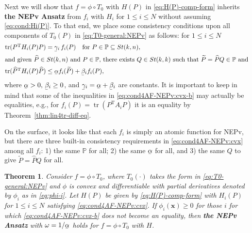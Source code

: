 \documentclass[11pt]{article}
\def\bx{\pmb{x}}
\def\bbP{\mathbb{P}}
\def\scrH{\mathscr{H}}
\def\wtd{\widetilde}
\def\what{\widehat}
\newcommand\munderbar[1]{%
  \underaccent{\bar}{#1}}
\newcommand\STM[2]{{\rm St}(#1,#2)}
\DeclareMathOperator{\tr}{tr}
\DeclareMathOperator{\T}{T}
\newtheorem{theorem}{Theorem}[section]
\theoremstyle{definition}
\numberwithin{equation}{section}
\begin{document}
Next we will show that $f=\phi\circ T_0$ with $H(P)$ in \eqref{eq:H(P)-comp-form} inherits
{\bf the NEPv Ansatz} from $f_i$ with $H_i$ for $1\le i\le N$
without assuming \eqref{eq:cond:Hi(P)}.
To that end, we  place some consistency conditions upon all components of $T_0(P)$ in \eqref{eq:T0-general:NEPv} as follows:
for $1\le i\le N$
%
%
%
%
%
\begin{subequations}\label{eq:cond4AF-NEPv:cvx}
\begin{align}
\tr(P^{\T}H_i(P)P)&=\munderbar\gamma_i\, f_i(P)\quad\mbox{for $P\in\bbP\subseteq\STM{k}{n}$},
              \label{eq:cond4AF-NEPv:cvx-a} \\
\intertext{and given $\what P\in\STM{k}{n}$ and $P\in\bbP$, there exists $Q\in\STM{k}{k}$ such
that $\wtd P=\what PQ\in\bbP$ and} %
\tr(\what P^{\T}H_i(P)\what P)
   &\le\munderbar\alpha f_i(\wtd P)+\munderbar\beta_i f_i(P),
      \label{eq:cond4AF-NEPv:cvx-b}
\end{align}
\end{subequations}
where $\munderbar\alpha>0,\,\munderbar\beta_i\ge 0$,  and
$\munderbar\gamma_i=\munderbar\alpha+\munderbar\beta_i$ are  constants.
It is important to keep in mind that some of the inequalities in \eqref{eq:cond4AF-NEPv:cvx-b} may  actually be equalities,
e.g.,  for $f_i(P)=\tr(P^{\T}A_iP)$ it is an equality by Theorem~\ref{thm:lin4tr-diff-eq}.


On the surface, it looks like that each $f_i$ is simply an atomic function for NEPv,  but there are three
built-in consistency requirements in \eqref{eq:cond4AF-NEPv:cvx} among
all $f_i$: 1) the same $\bbP$ for all;  2) the same $\munderbar\alpha$ for all, and
3) the same $Q$ to give $\wtd P=\what PQ$ for all.

\begin{theorem}\label{thm:main-NEPv-cvx}
Consider $f=\phi\circ T_0$, where $T_0(\cdot)$ takes the form in \eqref{eq:T0-general:NEPv} and $\phi$ is convex and differentiable with partial derivatives denoted by
$\phi_i$ as in \eqref{eq:phi-i}. Let $H(P)$ be given by \eqref{eq:H(P)-comp-form} with $H_i(P)$ for $1\le i\le N$
satisfying \eqref{eq:cond4AF-NEPv:cvx}.
If $\phi_i(\bx)\ge 0$ for those $i$ for which \eqref{eq:cond4AF-NEPv:cvx-b} does not become an equality, then
{\bf the NEPv Ansatz}   with $\omega=1/\munderbar\alpha$ holds for $f=\phi\circ T_0$ with $H$.
\end{theorem}
\end{document}
